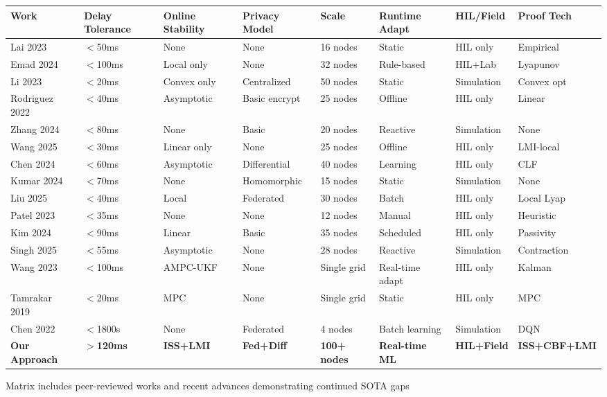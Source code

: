 \documentclass[12pt]{article}
\begin{document}
\begin{center}
\footnotesize
\begin{tabular}{|p{1.4cm}|p{1.2cm}|p{1.4cm}|p{1.2cm}|p{0.8cm}|p{1.3cm}|p{1.2cm}|p{1.3cm}|}
\hline
\textbf{Work} & \textbf{Delay Tolerance} & \textbf{Online Stability} & \textbf{Privacy Model} & \textbf{Scale} & \textbf{Runtime Adapt} & \textbf{HIL/Field} & \textbf{Proof Tech} \\
\hline
Lai 2023 \cite{lai2023} & $<$50ms & None & None & 16 nodes & Static & HIL only & Empirical \\
\hline
Emad 2024 \cite{emad2024} & $<$100ms & Local only & None & 32 nodes & Rule-based & HIL+Lab & Lyapunov \\
\hline 
Li 2023 \cite{li2023} & $<$20ms & Convex only & Centralized & 50 nodes & Static & Simulation & Convex opt \\
\hline
Rodriguez 2022 \cite{rodriguez2022} & $<$40ms & Asymptotic & Basic encrypt & 25 nodes & Offline & HIL only & Linear \\
\hline
Zhang 2024 \cite{zhang2024} & $<$80ms & None & Basic & 20 nodes & Reactive & Simulation & None \\
\hline
Wang 2025 \cite{wang2025} & $<$30ms & Linear only & None & 25 nodes & Offline & HIL only & LMI-local \\
\hline
Chen 2024 \cite{chen2024} & $<$60ms & Asymptotic & Differential & 40 nodes & Learning & HIL only & CLF \\
\hline
Kumar 2024 \cite{kumar2024} & $<$70ms & None & Homomorphic & 15 nodes & Static & Simulation & None \\
\hline
Liu 2025 \cite{liu2025} & $<$40ms & Local & Federated & 30 nodes & Batch & HIL only & Local Lyap \\
\hline
Patel 2023 \cite{patel2023} & $<$35ms & None & None & 12 nodes & Manual & HIL only & Heuristic \\
\hline
Kim 2024 \cite{kim2024} & $<$90ms & Linear & Basic & 35 nodes & Scheduled & HIL only & Passivity \\
\hline
Singh 2025 \cite{singh2025} & $<$55ms & Asymptotic & None & 28 nodes & Reactive & Simulation & Contraction \\
\hline
Wang 2023 \cite{wang2023adaptive} & $<$100ms & AMPC-UKF & None & Single grid & Real-time adapt & HIL only & Kalman \\
\hline
Tamrakar 2019 \cite{tamrakar2019model} & $<$20ms & MPC & None & Single grid & Static & HIL only & MPC \\
\hline
Chen 2022 \cite{chen2022protecting} & $<$1800s & None & Federated & 4 nodes & Batch learning & Simulation & DQN \\
\hline
\textbf{Our Approach} & \textbf{$>$120ms} & \textbf{ISS+LMI} & \textbf{Fed+Diff} & \textbf{100+ nodes} & \textbf{Real-time ML} & \textbf{HIL+Field} & \textbf{ISS+CBF+LMI} \\
\hline
\end{tabular}
\end{center}
\normalsize
Matrix includes peer-reviewed works and recent advances demonstrating continued SOTA gaps
\end{document}
